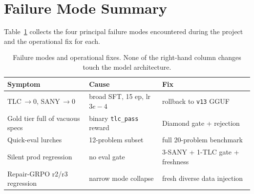 \documentclass[11pt]{article}
\begin{document}
\section{Failure Mode Summary}
\label{sec:app-failure-modes}

Table~\ref{tab:lessons} collects the four principal failure modes
encountered during the project and the operational fix for each.

\begin{table}[h]
\centering
\small
\begin{tabular}{@{}p{30mm}p{28mm}p{30mm}@{}}
\toprule
Symptom & Cause & Fix \\
\midrule
TLC$\,\to\!0$, SANY$\,\to\!0$ & broad SFT, 15 ep, lr $3e\!-\!4$
  & rollback to \texttt{v13} GGUF \\
Gold tier full of vacuous specs & binary \texttt{tlc\_pass} reward
  & Diamond gate + rejection \\
Quick-eval lurches & 12-problem subset
  & full 20-problem benchmark \\
Silent prod regression & no eval gate
  & 3-SANY + 1-TLC gate + freshness \\
Repair-GRPO r2/r3 regression & narrow mode collapse
  & fresh diverse data injection \\
\bottomrule
\end{tabular}
\caption{Failure modes and operational fixes.  None of the right-hand
column changes touch the model architecture.}
\label{tab:lessons}
\end{table}
\end{document}
